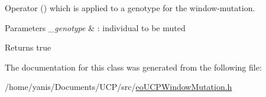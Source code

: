 \-Operator () which is applied to a genotype for the window-\/mutation. 


\begin{DoxyParams}{\-Parameters}
{\em \-\_\-genotype} & \-: individual to be muted \\
\hline
\end{DoxyParams}
\begin{DoxyReturn}{\-Returns}
true 
\end{DoxyReturn}


\-The documentation for this class was generated from the following file\-:\begin{DoxyCompactItemize}
\item 
/home/yanis/\-Documents/\-U\-C\-P/src/\hyperlink{eo_u_c_p_window_mutation_8h}{eo\-U\-C\-P\-Window\-Mutation.\-h}\end{DoxyCompactItemize}
